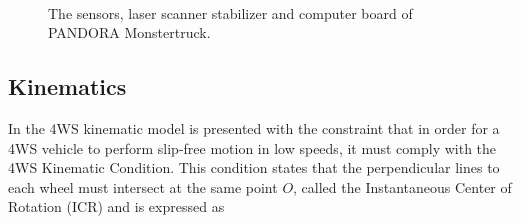 \documentclass[conference]{IEEEtran}
\begin{document}
\begin{figure}[!ht]
	\centering
	\hspace{0.7cm}	
	\hspace{0.7cm}	
	\\
	\hspace{0.8cm}
	\caption{The sensors, laser scanner stabilizer and computer board of PANDORA Monstertruck.}
\end{figure}

\subsection{Kinematics}
In \cite{vehicle_dynamics} the 4WS kinematic model is presented with the constraint that in order for a 4WS vehicle to perform slip-free motion in low speeds, it must comply with the 4WS Kinematic Condition. This condition states that the perpendicular lines to each wheel must intersect at the same point $O$, called the Instantaneous Center of Rotation (ICR) and is expressed as
\end{document}
